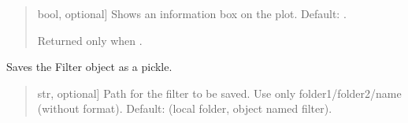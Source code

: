\documentclass[letterpaper,10pt,english]{sphinxmanual}
\begin{document}
\begin{fulllineitems}
\begin{fulllineitems}
\begin{quote}
\begin{description}
\begin{description}
\sphinxlineitem{\sphinxstylestrong{show\_info\_box}}{[}bool, optional{]}
\sphinxAtStartPar
Shows an information box on the plot. Default: .

\end{description}

\begin{description}
\sphinxAtStartPar
Returned only when .

\end{description}

\end{description}\end{quote}

\end{fulllineitems}


\begin{fulllineitems}
\label{\detokenize{classes:dsptools.classes.filter_class.Filter.sampling_rate_hz}}
\pysigstartsignatures
{}
\pysigstopsignatures
\end{fulllineitems}


\begin{fulllineitems}
\label{\detokenize{classes:dsptools.classes.filter_class.Filter.save_filter}}
\pysigstartsignatures
{}
\pysigstopsignatures
\sphinxAtStartPar
Saves the Filter object as a pickle.
\begin{quote}\begin{description}
\begin{description}
\sphinxlineitem{\sphinxstylestrong{path}}{[}str, optional{]}
\sphinxAtStartPar
Path for the filter to be saved. Use only folder1/folder2/name
(without format). Default: 
(local folder, object named filter).


\end{description}
\end{description}
\end{quote}
\end{fulllineitems}
\end{fulllineitems}
\end{document}
